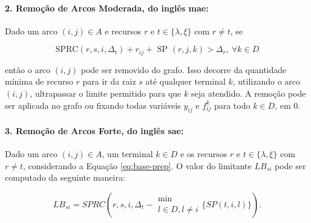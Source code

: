 \noindent \paragraph*{2. Remoção  de Arcos Moderada, do  inglês \gls{mae}:} Dado
um arco $(i, j) \in A$ e recursos $r$ e $t \in \{\lambda, \xi\}$ com $r \neq t$,
se

\begin{equation}
    \text{SPRC}(r, s,  i, \Delta_t) + r_{ij}  + \text{ SP }(r,  j, k) > \Delta_r, \ \forall k \in D
  \end{equation}

então o  arco $(i, j)$  pode ser removido do  grafo. Isso decorre  da quantidade
mínima de recurso $r$ para ir da  raiz $s$ até qualquer terminal $k$, utilizando
o arco $(i,  j)$, ultrapassar o limite  permitido para que $k$  seja atendido. A
remoção  pode ser  aplicada  no  grafo ou  fixando  todas  variáveis $y_{ij}$  e
$f_{ij}^k$ para todo $k \in D$, em $0$.

\noindent \paragraph*{3. Remoção  de Arcos Forte, do inglês  \gls{sae}:} Dado um
arco $(i, j) \in A$, um terminal $k \in D$ e os recursos $r$ e $t \in \{\lambda,
\xi\}$ com $r  \neq t$, considerando a Equação \eqref{eq:base-prep}.  O valor do
limitante $LB_{si}$ pode ser computado da seguinte maneira:

\begin{equation}
    LB_{si} = SPRC(r, s, i, \Delta_t - \substack{\min \\ l \in D, l \neq i} \{SP(t, i, l)\}). \label{eq:lbsi}
 \end{equation}

